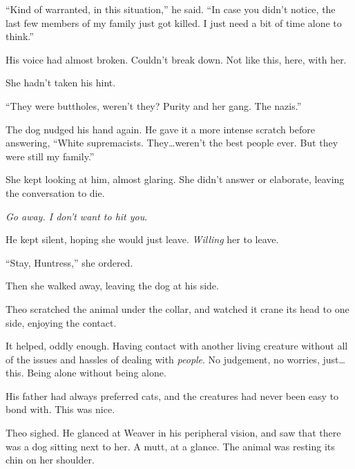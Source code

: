 ``Kind of warranted, in this situation,'' he said.  ``In case you didn't notice, the last few members of my family just got killed.  I just need a bit of time alone to think.''



His voice had almost broken.  Couldn't break down.  Not like this, here, with her.



She hadn't taken his hint.



``They were buttholes, weren't they?  Purity and her gang.  The nazis.''



The dog nudged his hand again.  He gave it a more intense scratch before answering, ``White supremacists.  They\ldots weren't the best people ever.  But they were still my family.''



She kept looking at him, almost glaring.  She didn't answer or elaborate, leaving the conversation to die.



\emph{Go away.  I don't want to hit you}.



He kept silent, hoping she would just leave.  \emph{Willing} her to leave.



``Stay, Huntress,'' she ordered.



Then she walked away, leaving the dog at his side.



Theo scratched the animal under the collar, and watched it crane its head to one side, enjoying the contact.



It helped, oddly enough.  Having contact with another living creature without all of the issues and hassles of dealing with \emph{people}.  No judgement, no worries, just\ldots this.  Being alone without being alone.



His father had always preferred cats, and the creatures had never been easy to bond with.  This was nice.



Theo sighed.  He glanced at Weaver in his peripheral vision, and saw that there was a dog sitting next to her.  A mutt, at a glance.  The animal was resting its chin on her shoulder.



